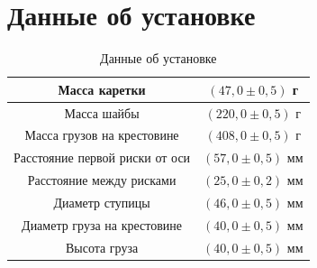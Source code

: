 \documentclass[11pt]{article}
\begin{document}
\section{Данные об установке}
\begin{table}[H]
	\centering
	\large
	\caption{Данные об установке}
	\begin{tabular}{|c|c|}
		\hline
		Масса каретки & $(47,0 \pm 0,5) $ г\\
		\hline
		Масса шайбы & $(220,0 \pm 0,5) $ г\\
		\hline
		Масса грузов на крестовине & $(408,0 \pm 0,5) $ г\\
		\hline
		Расстояние первой риски от оси & $(57,0 \pm 0,5) $ мм\\
		\hline
		Расстояние между рисками & $(25,0 \pm 0,2) $ мм\\
		\hline
		Диаметр ступицы & $(46,0 \pm 0,5) $ мм\\
		\hline
		Диаметр груза на крестовине & $(40,0 \pm 0,5) $ мм\\
		\hline
		Высота груза & $(40,0 \pm 0,5) $ мм\\
		\hline
	\end{tabular}
\end{table}
\pagebreak
\end{document}
